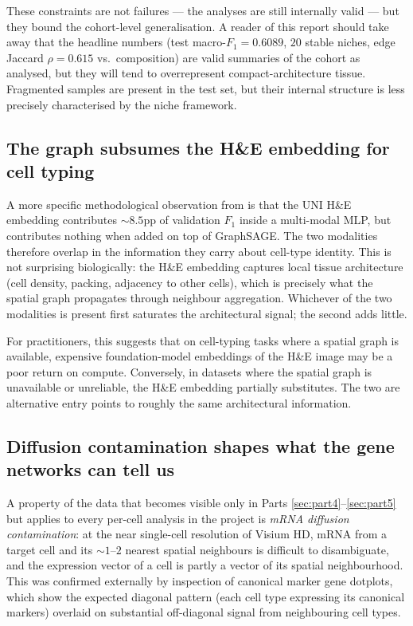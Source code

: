 These constraints are not failures --- the analyses are still internally valid --- but they bound the cohort-level generalisation. A reader of this report should take away that the headline numbers (test macro-$F_1 = 0.6089$, $20$ stable niches, edge Jaccard $\rho = 0.615$ vs.\ composition) are valid summaries of the cohort as analysed, but they will tend to overrepresent compact-architecture tissue. Fragmented samples are present in the test set, but their internal structure is less precisely characterised by the niche framework.

\subsection*{The graph subsumes the H\&E embedding for cell typing}

A more specific methodological observation from  is that the UNI H\&E embedding contributes $\sim 8.5$pp of validation $F_1$ inside a multi-modal MLP, but contributes nothing when added on top of GraphSAGE. The two modalities therefore overlap in the information they carry about cell-type identity. This is not surprising biologically: the H\&E embedding captures local tissue architecture (cell density, packing, adjacency to other cells), which is precisely what the spatial graph propagates through neighbour aggregation. Whichever of the two modalities is present first saturates the architectural signal; the second adds little.

For practitioners, this suggests that on cell-typing tasks where a spatial graph is available, expensive foundation-model embeddings of the H\&E image may be a poor return on compute. Conversely, in datasets where the spatial graph is unavailable or unreliable, the H\&E embedding partially substitutes. The two are alternative entry points to roughly the same architectural information.

\subsection*{Diffusion contamination shapes what the gene networks can tell us}

A property of the data that becomes visible only in Parts \ref{sec:part4}--\ref{sec:part5} but applies to every per-cell analysis in the project is \emph{mRNA diffusion contamination}: at the near single-cell resolution of Visium HD, mRNA from a target cell and its $\sim 1$--$2$ nearest spatial neighbours is difficult to disambiguate, and the expression vector of a cell is partly a vector of its spatial neighbourhood. This was confirmed externally by inspection of canonical marker gene dotplots, which show the expected diagonal pattern (each cell type expressing its canonical markers) overlaid on substantial off-diagonal signal from neighbouring cell types.

